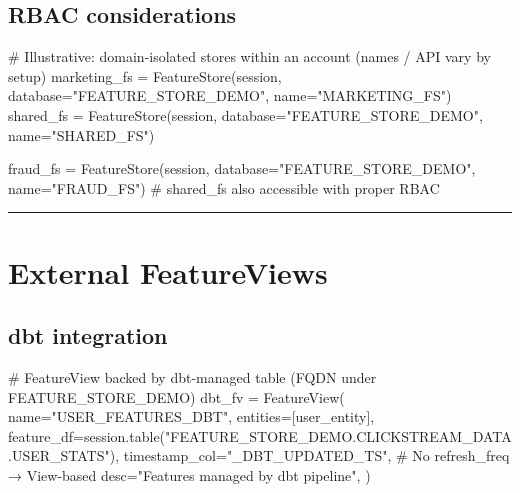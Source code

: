 \documentclass[
  letterpaper,
  DIV=11,
  numbers=noendperiod]{scrreprt}
\newenvironment{Shaded}{\begin{snugshade}}{\end{snugshade}}
\newcommand{\CommentTok}[1]{\textcolor[rgb]{0.37,0.37,0.37}{#1}}
\newcommand{\NormalTok}[1]{\textcolor[rgb]{0.00,0.23,0.31}{#1}}
\newcommand{\OperatorTok}[1]{\textcolor[rgb]{0.37,0.37,0.37}{#1}}
\newcommand{\StringTok}[1]{\textcolor[rgb]{0.13,0.47,0.30}{#1}}
\begin{document}
\hypertarget{rbac-considerations}{%
\subsection{RBAC considerations}\label{rbac-considerations}}

\begin{Shaded}
\begin{Highlighting}[]
\CommentTok{\# Illustrative: domain{-}isolated stores within an account (names / API vary by setup)}
\NormalTok{marketing\_fs }\OperatorTok{=}\NormalTok{ FeatureStore(session, database}\OperatorTok{=}\StringTok{"FEATURE\_STORE\_DEMO"}\NormalTok{, name}\OperatorTok{=}\StringTok{"MARKETING\_FS"}\NormalTok{)}
\NormalTok{shared\_fs }\OperatorTok{=}\NormalTok{ FeatureStore(session, database}\OperatorTok{=}\StringTok{"FEATURE\_STORE\_DEMO"}\NormalTok{, name}\OperatorTok{=}\StringTok{"SHARED\_FS"}\NormalTok{)}

\NormalTok{fraud\_fs }\OperatorTok{=}\NormalTok{ FeatureStore(session, database}\OperatorTok{=}\StringTok{"FEATURE\_STORE\_DEMO"}\NormalTok{, name}\OperatorTok{=}\StringTok{"FRAUD\_FS"}\NormalTok{)}
\CommentTok{\# shared\_fs also accessible with proper RBAC}
\end{Highlighting}
\end{Shaded}

\begin{center}\rule{0.5\linewidth}{0.5pt}\end{center}

\hypertarget{external-featureviews}{%
\section{External FeatureViews}\label{external-featureviews}}

\hypertarget{dbt-integration}{%
\subsection{dbt integration}\label{dbt-integration}}

\begin{Shaded}
\begin{Highlighting}[]
\CommentTok{\# FeatureView backed by dbt{-}managed table (FQDN under FEATURE\_STORE\_DEMO)}
\NormalTok{dbt\_fv }\OperatorTok{=}\NormalTok{ FeatureView(}
\NormalTok{    name}\OperatorTok{=}\StringTok{"USER\_FEATURES\_DBT"}\NormalTok{,}
\NormalTok{    entities}\OperatorTok{=}\NormalTok{[user\_entity],}
\NormalTok{    feature\_df}\OperatorTok{=}\NormalTok{session.table(}\StringTok{"FEATURE\_STORE\_DEMO.CLICKSTREAM\_DATA.USER\_STATS"}\NormalTok{),}
\NormalTok{    timestamp\_col}\OperatorTok{=}\StringTok{"\_DBT\_UPDATED\_TS"}\NormalTok{,}
    \CommentTok{\# No refresh\_freq → View{-}based}
\NormalTok{    desc}\OperatorTok{=}\StringTok{"Features managed by dbt pipeline"}\NormalTok{,}
\NormalTok{)}
\end{Highlighting}
\end{Shaded}
\end{document}
